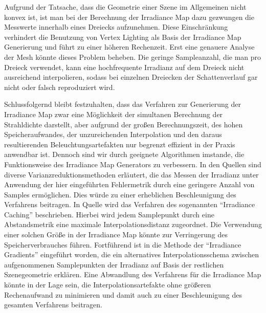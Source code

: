 	Aufgrund der Tatsache, dass die Geometrie einer Szene im Allgemeinen nicht konvex ist, ist man bei der Berechnung der Irradiance Map dazu gezwungen die Messwerte innerhalb eines Dreiecks aufzunehmen.
	Diese Einschränkung verhindert die Benutzung von Vertex Lighting als Basis der Irradiance Map Generierung und führt zu einer höheren Rechenzeit.
	Erst eine genauere Analyse der Mesh könnte dieses Problem beheben.
	Die geringe Sampleanzahl, die man pro Dreieck verwendet, kann eine hochfrequente Irradianz auf dem Dreieck nicht ausreichend interpolieren, sodass bei einzelnen Dreiecken der Schattenverlauf gar nicht oder falsch reproduziert wird.

	Schlussfolgernd bleibt festzuhalten, dass das Verfahren zur Generierung der Irradiance Map zwar eine Möglichkeit der simultanen Berechnung der Strahldichte darstellt, aber aufgrund der großen Berechnungszeit, des hohen Speicheraufwandes, der unzureichenden Interpolation und den daraus resultierenden Beleuchtungsartefakten nur begrenzt effizient in der Praxis anwendbar ist.
	Dennoch sind wir durch geeignete Algorithmen imstande, die Funktionsweise des Irradiance Map Generators zu verbessern.
	In den Quellen \cite{quasi-monte-carlo,pbrt3,veach-thesis} sind diverse Varianzreduktionsmethoden erläutert, die das Messen der Irradianz unter Anwendung der hier eingeführten Fehlermetrik durch eine geringere Anzahl von Samples ermöglichen.
	Dies würde zu einer erheblichen Beschleunigung des Verfahrens beitragen.
	In Quelle \cite{pbrt2} wird das Verfahren des sogenannten \enquote{Irradiance Caching} beschrieben.
	Hierbei wird jedem Samplepunkt durch eine Abstandsmetrik eine maximale Interpolationsdistanz zugeordnet.
	Die Verwendung einer solchen Größe in der Irradiance Map könnte zur Verringerung des Speicherverbrauches führen.
	Fortführend ist in \cite{irr-grad} die Methode der \enquote{Irradiance Gradients} eingeführt worden, die ein alternatives Interpolationsschema zwischen aufgenommenen Samplepunkten der Irradianz auf Basis der restlichen Szenegeometrie erklären.
	Eine Abwandlung des Verfahrens für die Irradiance Map könnte in der Lage sein, die Interpolationsartefakte ohne größeren Rechenaufwand zu minimieren und damit auch zu einer Beschleunigung des gesamten Verfahrens beitragen.

